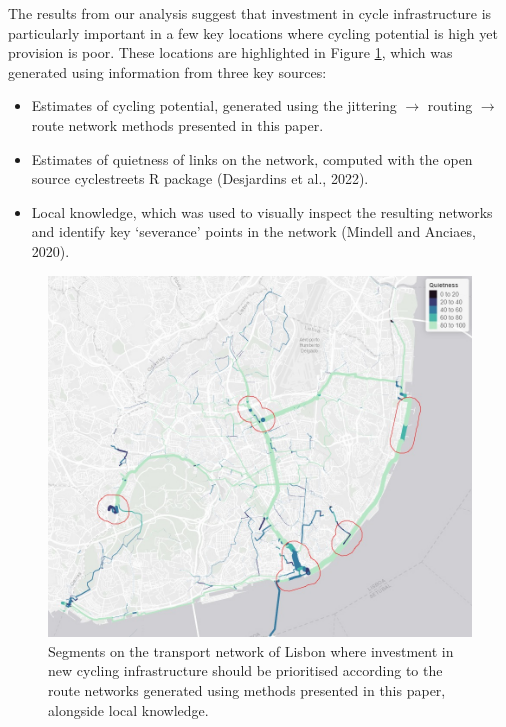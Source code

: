 \documentclass{isprs} %
\providecommand{\tightlist}{%
  \setlength{\itemsep}{0pt}\setlength{\parskip}{0pt}}
\begin{document}
The results from our analysis suggest that investment in cycle infrastructure is particularly important in a few key locations where cycling potential is high yet provision is poor.
These locations are highlighted in Figure \ref{fig:segments}, which was generated using information from three key sources:

\begin{itemize}
\tightlist
\item
  Estimates of cycling potential, generated using the jittering \(\rightarrow\) routing \(\rightarrow\) route network methods presented in this paper.
\item
  Estimates of quietness of links on the network, computed with the open source cyclestreets R package (Desjardins et al., 2022).
\item
  Local knowledge, which was used to visually inspect the resulting networks and identify key `severance' points in the network (Mindell and Anciaes, 2020).
\end{itemize}

\begin{figure}

{\centering \includegraphics[width=1\linewidth]{figures/priority-segments} 

}

\caption{Segments on the transport network of Lisbon where investment in new cycling infrastructure should be prioritised according to the route networks generated using methods presented in this paper, alongside local knowledge.}\label{fig:segments}
\end{figure}
\end{document}
